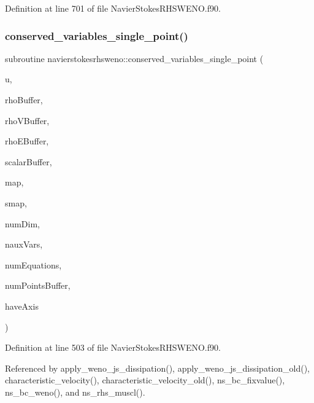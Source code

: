 Definition at line 701 of file Navier\+Stokes\+R\+H\+S\+W\+E\+N\+O.\+f90.

\hypertarget{namespacenavierstokesrhsweno_a915a5f75335f503106a55b3359b23e4f}{}\label{namespacenavierstokesrhsweno_a915a5f75335f503106a55b3359b23e4f} 
\subsubsection{\texorpdfstring{conserved\+\_\+variables\+\_\+single\+\_\+point()}{conserved\_variables\_single\_point()}}
{\footnotesize\ttfamily subroutine navierstokesrhsweno\+::conserved\+\_\+variables\+\_\+single\+\_\+point (\begin{DoxyParamCaption}\item[{real(kind=8), dimension(numequations)}]{u,  }\item[{real(kind=8), dimension(numpointsbuffer), intent(in)}]{rho\+Buffer,  }\item[{real(kind=8), dimension(numdim$\ast$numpointsbuffer), intent(in), target}]{rho\+V\+Buffer,  }\item[{real(kind=8), dimension(numpointsbuffer), intent(in)}]{rho\+E\+Buffer,  }\item[{real(kind=8), dimension(nauxvars$\ast$numpointsbuffer), intent(in), target}]{scalar\+Buffer,  }\item[{integer(kind=8)}]{map,  }\item[{real(kind=8), dimension(\+:)}]{smap,  }\item[{integer(kind=4)}]{num\+Dim,  }\item[{integer(kind=4)}]{naux\+Vars,  }\item[{integer(kind=4)}]{num\+Equations,  }\item[{integer(kind=8)}]{num\+Points\+Buffer,  }\item[{integer(kind=4)}]{have\+Axis }\end{DoxyParamCaption})}



Definition at line 503 of file Navier\+Stokes\+R\+H\+S\+W\+E\+N\+O.\+f90.



Referenced by apply\+\_\+weno\+\_\+js\+\_\+dissipation(), apply\+\_\+weno\+\_\+js\+\_\+dissipation\+\_\+old(), characteristic\+\_\+velocity(), characteristic\+\_\+velocity\+\_\+old(), ns\+\_\+bc\+\_\+fixvalue(), ns\+\_\+bc\+\_\+weno(), and ns\+\_\+rhs\+\_\+muscl().

